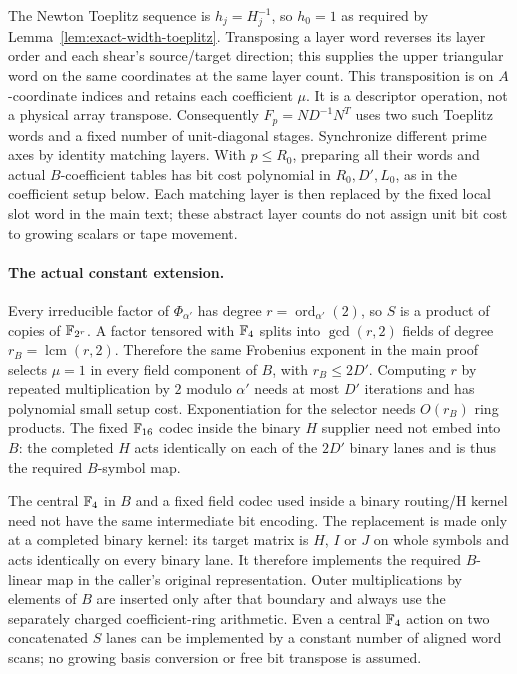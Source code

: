 The Newton Toeplitz sequence is $h_j=H_j^{-1}$, so $h_0=1$ as required
by Lemma~\ref{lem:exact-width-toeplitz}. Transposing a layer word reverses
its layer order and each shear's source/target direction; this supplies
the upper triangular word on the same coordinates at the same layer
count. This transposition is on $A$-coordinate indices and retains each
coefficient $\mu$. It is a descriptor operation, not a physical array transpose.
Consequently $F_p=ND^{-1}N^T$ uses two such Toeplitz words and a fixed
number of unit-diagonal stages. Synchronize different prime axes by
identity matching layers. With $p\le R_0$, preparing all their words and
actual $B$-coefficient tables has bit cost polynomial in $R_0,D',L_0$,
as in the coefficient setup below. Each matching layer is then replaced
by the fixed local slot word in the main text; these abstract layer
counts do not assign unit bit cost to growing scalars or tape movement.

\paragraph{The actual constant extension.}
Every irreducible factor of $\Phi_{\alpha'}$ has degree
$r=\operatorname{ord}_{\alpha'}(2)$, so $S$ is a product of copies
of $\mathbb F_{2^r}$. A factor tensored with $\mathbb F_4$ splits into
$\gcd(r,2)$ fields of degree $r_B=\operatorname{lcm}(r,2)$.
Therefore the same Frobenius exponent in the main proof selects
$\mu=1$ in every field component of $B$, with $r_B\le2D'$.
Computing $r$ by repeated multiplication by $2$ modulo $\alpha'$
needs at most $D'$ iterations and has polynomial small setup cost.
Exponentiation for the selector needs $O(r_B)$ ring products.
The fixed $\mathbb F_{16}$ codec inside the binary $H$ supplier need not
embed into $B$: the completed $H$ acts identically on each of the
$2D'$ binary lanes and is thus the required $B$-symbol map.

The central $\mathbb F_4$ in $B$ and a fixed field codec used inside a
binary routing/H kernel need not have the same intermediate bit
encoding. The replacement is made only at a completed binary kernel:
its target matrix is $H$, $I$ or $J$ on whole symbols and acts
identically on every binary lane. It therefore implements the required
$B$-linear map in the caller's original representation. Outer
multiplications by elements of $B$ are inserted only after that
boundary and always use the separately charged coefficient-ring
arithmetic. Even a central $\mathbb F_4$ action on two concatenated $S$
lanes can be implemented by a constant number of aligned word scans;
no growing basis conversion or free bit transpose is assumed.

